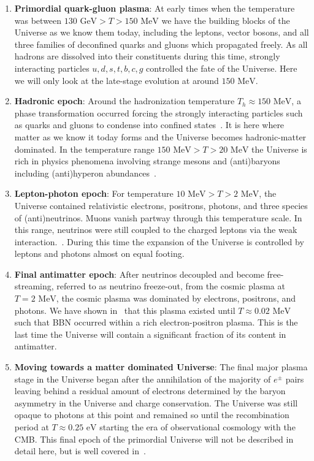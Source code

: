\documentclass[universe,article,submit,moreauthors,pdftex,a4paper]{Definitions/mdpi}
\newcommand{\GeV}{\text{ GeV}}
\newcommand{\MeV}{\text{ MeV}}
\newcommand{\eV}{\text{ eV}}
\begin{document}
\begin{enumerate}
    \item \textbf{Primordial quark-gluon plasma}: At early times when the temperature was between $130\GeV>T>150\MeV$ we have the building blocks of the Universe as we know them today, including the leptons, vector bosons, and all three families of deconfined quarks and gluons which propagated freely. As all hadrons are dissolved into their constituents during this time, strongly interacting particles $u,d,s,t,b,c,g$ controlled the fate of the Universe. Here we will only look at the late-stage evolution at around $150\MeV$.
    \item \textbf{Hadronic epoch}: Around the hadronization temperature $T_h\approx150\MeV$, a phase transformation occurred forcing the strongly interacting particles such as quarks and gluons to condense into confined states~\cite{Letessier:2005qe}. It is here where matter as we know it today forms and the Universe becomes hadronic-matter dominated. In the temperature range $ 150\MeV>T>20\MeV$ the Universe is rich in physics phenomena involving strange mesons and (anti)baryons including (anti)hyperon abundances~\cite{Fromerth:2012fe,Yang:2021bko}.
    \item \textbf{Lepton-photon epoch}: For temperature $10\MeV>T>2\MeV$, the Universe contained relativistic electrons, positrons, photons, and three species of (anti)neutrinos. Muons vanish partway through this temperature scale. In this range, neutrinos were still coupled to the charged leptons via the weak interaction.~\cite{Birrell:2012gg,Birrell:2014ona}. During this time the expansion of the Universe is controlled by leptons and photons almost on equal footing.
    \item \textbf{Final antimatter epoch}: After neutrinos decoupled and become free-streaming, referred to as neutrino freeze-out, from the cosmic plasma at $T=2\MeV$, the cosmic plasma was dominated by electrons, positrons, and photons. We have shown in~\cite{Chris:2023abc} that this plasma existed until $T\approx0.02\MeV$ such that BBN occurred within a rich electron-positron plasma. This is the last time the Universe will contain a significant fraction of its content in antimatter.
    \item \textbf{Moving towards a matter dominated Universe}: The final major plasma stage in the Universe began after the annihilation of the majority of $e^{\pm}$ pairs leaving behind a residual amount of electrons determined by the baryon asymmetry in the Universe and charge conservation. The Universe was still opaque to photons at this point and remained so until the recombination period at $T\approx0.25\eV$ starting the era of observational cosmology with the CMB. This final epoch of the primordial Universe will not be described in detail here, but is well covered in~\cite{Planck:2018vyg}.
\end{enumerate}
\end{document}
